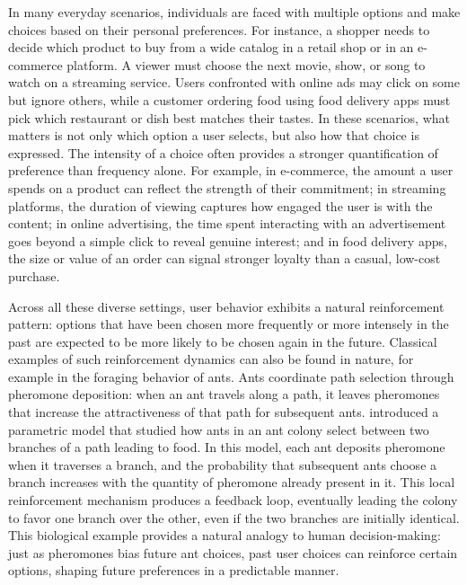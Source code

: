 \documentclass[12pt]{amsart}
\theoremstyle{plain}
\theoremstyle{remark}
\numberwithin{equation}{section}
\begin{document}
In many everyday scenarios, individuals are faced with multiple options and make choices based on their personal preferences. 
For instance, a shopper needs to decide which product to buy from a wide catalog in a retail shop or in an e-commerce platform. A viewer must choose the next movie, show, or song to watch on a streaming service. Users confronted with online ads may click on some but ignore others, while a customer ordering food using food delivery apps must pick which restaurant or dish best matches their tastes. In these scenarios, what matters is not only which option a user selects, but also how that choice is expressed. 
The intensity of a choice often provides a stronger quantification of preference than frequency alone. For example, in e-commerce, the amount a user spends on a product can reflect the strength of their commitment; in streaming platforms, the duration of viewing captures how engaged the user is with the content; in online advertising, the time spent interacting with an advertisement goes beyond a simple click to reveal genuine interest; and in food delivery apps, the size or value of an order can signal stronger loyalty than a casual, low-cost purchase. 

Across all these diverse settings, 
user behavior exhibits a natural reinforcement pattern: options that have been chosen more frequently or more intensely in the past are expected to be more likely to be chosen again in the future. Classical examples of such reinforcement dynamics can also be found in nature, for example in the foraging behavior of ants. Ants coordinate path selection through pheromone deposition: when an ant travels along a path, it leaves pheromones that increase the attractiveness of that path for subsequent ants. 
\cite{deneubourg1990self} introduced a parametric model that studied how ants in an ant colony select between two branches of a path leading to food. In this model, each ant deposits pheromone when it traverses a branch, and the probability that subsequent ants choose a branch increases with the quantity of pheromone already present in it. This local reinforcement mechanism produces a feedback loop, eventually leading the colony to favor one branch over the other, even if the two branches are initially identical. This biological example provides a natural analogy to human decision-making: 
just as pheromones bias future ant choices, past user choices can reinforce certain options, shaping future preferences in a predictable manner.
\end{document}
